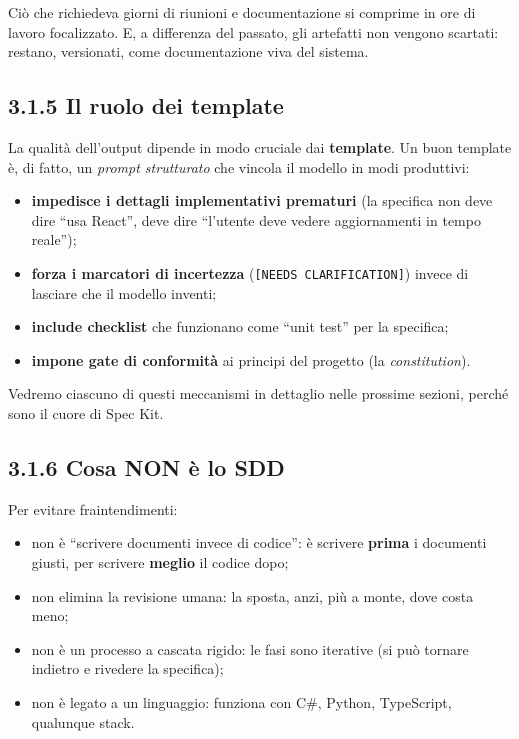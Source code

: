 \documentclass[
  italian,
  10pt,
]{book}
\providecommand{\tightlist}{%
  \setlength{\itemsep}{0pt}\setlength{\parskip}{0pt}}
\begin{document}
Ciò che richiedeva giorni di riunioni e documentazione si comprime in
ore di lavoro focalizzato. E, a differenza del passato, gli artefatti
non vengono scartati: restano, versionati, come documentazione viva del
sistema.

\subsection{3.1.5 Il ruolo dei template}\label{il-ruolo-dei-template}

La qualità dell'output dipende in modo cruciale dai \textbf{template}.
Un buon template è, di fatto, un \emph{prompt strutturato} che vincola
il modello in modi produttivi:

\begin{itemize}
\tightlist
\item
  \textbf{impedisce i dettagli implementativi prematuri} (la specifica
  non deve dire ``usa React'', deve dire ``l'utente deve vedere
  aggiornamenti in tempo reale'');
\item
  \textbf{forza i marcatori di incertezza}
  (\texttt{{[}NEEDS\ CLARIFICATION{]}}) invece di lasciare che il
  modello inventi;
\item
  \textbf{include checklist} che funzionano come ``unit test'' per la
  specifica;
\item
  \textbf{impone gate di conformità} ai principi del progetto (la
  \emph{constitution}).
\end{itemize}

Vedremo ciascuno di questi meccanismi in dettaglio nelle prossime
sezioni, perché sono il cuore di Spec Kit.

\subsection{3.1.6 Cosa NON è lo SDD}\label{cosa-non-uxe8-lo-sdd}

Per evitare fraintendimenti:

\begin{itemize}
\tightlist
\item
  non è ``scrivere documenti invece di codice'': è scrivere
  \textbf{prima} i documenti giusti, per scrivere \textbf{meglio} il
  codice dopo;
\item
  non elimina la revisione umana: la sposta, anzi, più a monte, dove
  costa meno;
\item
  non è un processo a cascata rigido: le fasi sono iterative (si può
  tornare indietro e rivedere la specifica);
\item
  non è legato a un linguaggio: funziona con C\#, Python, TypeScript,
  qualunque stack.
\end{itemize}
\end{document}
